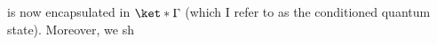  is now encapsulated in $\ket*{\Gamma}$ (which I refer to as the conditioned quantum state). Moreover, we sh